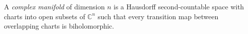 
A \emph{complex manifold} of dimension $n$ is a Hausdorff second-countable space with charts into open subsets of $\mathbb C^n$ such that every transition map between overlapping charts is biholomorphic.
